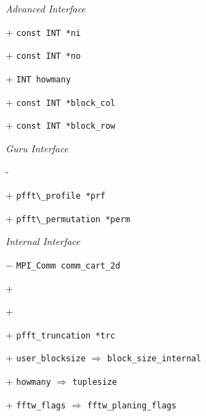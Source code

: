 \emph{Advanced Interface}
\begin{compactitem}
  \item[+] \verb+const INT *ni+
  \item[+] \verb+const INT *no+
  \item[+] \verb+INT howmany+
  \item[+] \verb+const INT *block_col+
  \item[+] \verb+const INT *block_row+
\end{compactitem}

\emph{Guru Interface}
\begin{compactitem}
  \item[-] 
  \item[+] \verb+pfft\_profile *prf+
  \item[+] \verb+pfft\_permutation *perm+
\end{compactitem}

\emph{Internal Interface}
\begin{compactitem}
  \item[$-$] \verb+MPI_Comm comm_cart_2d+
  \item[+] 
  \item[+] 
  \item[+] \verb+pfft_truncation *trc+
  \item[+] \verb+user_blocksize+ $\Rightarrow$ \verb+block_size_internal+
  \item[+] \verb+howmany+ $\Rightarrow$ \verb+tuplesize+
  \item[+] \verb+fftw_flags+ $\Rightarrow$ \verb+fftw_planing_flags+
\end{compactitem}


\newcommand{\redlst}[1]{\lstinline+#1+}

\newpage
